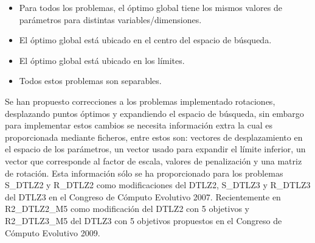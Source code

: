 \begin{itemize}
\item Para todos los problemas, el óptimo global tiene los mismos valores de parámetros para distintas variables/dimensiones.
\item El óptimo global está ubicado en el centro del espacio de búsqueda.
\item El óptimo global está ubicado en los límites.
\item Todos estos problemas son separables.
\end{itemize}
Se han propuesto correcciones a los problemas implementado rotaciones, desplazando puntos óptimos y expandiendo el espacio de búsqueda, sin embargo para implementar estos cambios se necesita información extra la cual es proporcionada mediante ficheros, entre estos son: vectores de desplazamiento en el espacio de los parámetros, un vector usado para expandir el límite inferior, un vector que corresponde al factor de escala, valores de penalización y una matriz de rotación.
%
Esta información sólo se ha proporcionado para los problemas S\_DTLZ2 y R\_DTLZ2 como modificaciones del DTLZ2, S\_DTLZ3 y R\_DTLZ3 del DTLZ3 en el Congreso de Cómputo Evolutivo 2007. Recientemente en R2\_DTLZ2\_M5 como modificación del DTLZ2 con 5 objetivos y R2\_DTLZ3\_M5 del DTLZ3 con 5 objetivos propuestos en el Congreso de Cómputo Evolutivo 2009. 

